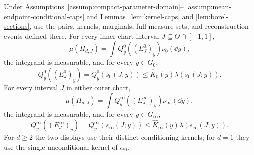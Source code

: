 \begin{proposition}
\label{prop:matching-disintegration}
Under Assumptions~\ref{assump:compact-parameter-domain}--
\ref{assump:mean-endpoint-conditional-caps} and
Lemmas~\ref{lem:kernel-caps} and \ref{lem:borel-sections}, use the pairs,
kernels, marginals, full-measure sets, and reconstruction events defined
there.  For every inner-chart interval $J\subseteq\Theta\cap[-1,1]$,
\begin{equation}
\mu(H_{d,J})=\int Q^0_y((E^0_J)_y)\nu_0(\dd y),
\label{eq:inner-disintegration}
\end{equation}
the integrand is measurable, and for every $y\in G_0$,
\begin{equation}
Q^0_y((E^0_J)_y)=Q^0_y(s_0(J;y))
\leq\widehat K_0(y)\lambda(s_0(J;y)).
\label{eq:inner-fiber-bound}
\end{equation}
For every interval $J$ in either outer chart,
\begin{equation}
\mu(H_{d,J})=\int Q^\infty_y((E^\infty_J)_y)\nu_\infty(\dd y),
\label{eq:outer-disintegration}
\end{equation}
the integrand is measurable, and for every $y\in G_\infty$,
\begin{equation}
Q^\infty_y((E^\infty_J)_y)=Q^\infty_y(s_\infty(J;y))
\leq\widehat K_\infty(y)\lambda(s_\infty(J;y)).
\label{eq:outer-fiber-bound}
\end{equation}
For $d\geq2$ the two displays use their distinct conditioning kernels; for
$d=1$ they use the single unconditional kernel of $\alpha_0$.
\end{proposition}

